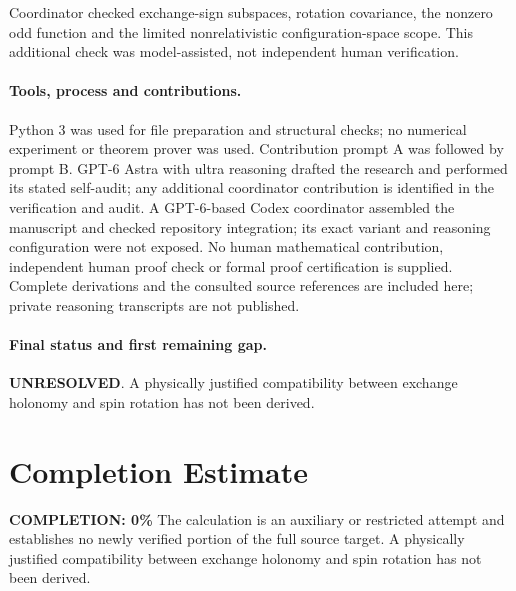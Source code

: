 \documentclass[11pt]{article}
\begin{document}
Coordinator checked exchange-sign subspaces, rotation covariance, the nonzero odd function and the limited nonrelativistic configuration-space scope. This additional check was model-assisted, not independent human verification.

\paragraph{Tools, process and contributions.}
Python 3 was used for file preparation and structural checks; no numerical experiment or theorem prover was used. Contribution prompt A was followed by prompt B. GPT-6 Astra with ultra reasoning drafted the research and performed its stated self-audit; any additional coordinator contribution is identified in the verification and audit. A GPT-6-based Codex coordinator assembled the manuscript and checked repository integration; its exact variant and reasoning configuration were not exposed. No human mathematical contribution, independent human proof check or formal proof certification is supplied. Complete derivations and the consulted source references are included here; private reasoning transcripts are not published.

\paragraph{Final status and first remaining gap.}
\textbf{UNRESOLVED}. A physically justified compatibility between exchange holonomy and spin rotation has not been derived.

\section{Completion Estimate}
\noindent\textbf{COMPLETION: 0\%}
The calculation is an auxiliary or restricted attempt and establishes no newly verified portion of the full source target. A physically justified compatibility between exchange holonomy and spin rotation has not been derived.
\end{document}
